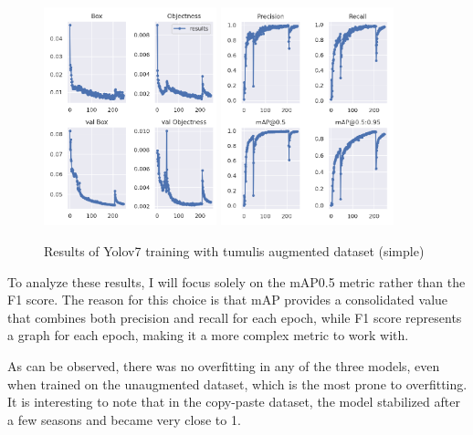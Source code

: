 \begin{figure}[H]
    \centering
    {{\includegraphics[width=5cm]{images/training/mamoas/maia1.png} }}
    \qquad
    {{\includegraphics[width=5cm]{images/training/mamoas/maia2.png} }}
    \caption{Results of Yolov7 training with tumulis augmented dataset (simple)}
    \label{fig:tumuliyolomaia}
\end{figure}

To analyze these results, I will focus solely on the mAP0.5 metric rather than the F1 score. The reason for this choice is that mAP provides a consolidated value that combines both precision and recall for each epoch, while F1 score represents a graph for each epoch, making it a more complex metric to work with.

As can be observed, there was no overfitting in any of the three models, even when trained on the unaugmented dataset, which is the most prone to overfitting. It is interesting to note that in the copy-paste dataset, the model stabilized after a few seasons and became very close to 1.

